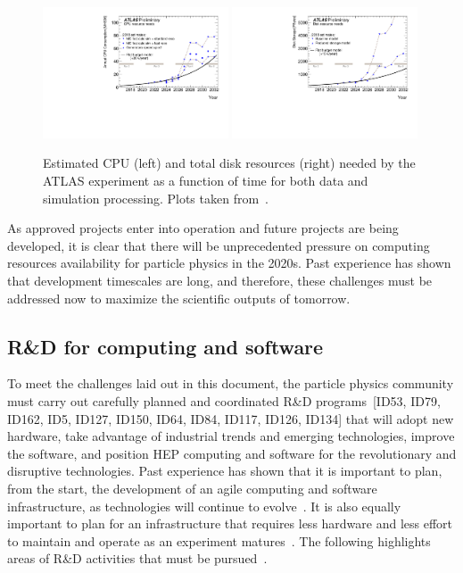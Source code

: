 \begin{figure}
    \centering
    \includegraphics[width=0.49\textwidth]{Instrum/img/ATLAS-cpu-HL-LHC.pdf}\hfill
    \includegraphics[width=0.49\textwidth]{Instrum/img/ATLAS-disk-HL-LHC.pdf}
    \caption{Estimated CPU (left) and total disk resources (right) needed by the ATLAS experiment as a function of time for both data and simulation processing.  Plots taken from~\cite{bib:atlas-computing}.
    }
    \label{fig:atlas-computing}
\end{figure}

As approved projects enter into operation and future projects are being developed, it is clear that there will be unprecedented pressure on computing resources availability for particle physics in the 2020s. 
Past experience has shown that development timescales are long, and therefore, these challenges must be addressed now to maximize the scientific outputs of tomorrow.  


\subsection{R\&D for computing and software}

To meet the challenges laid out in this document, the particle physics community must carry out carefully planned and coordinated R\&D programs~[ID53, ID79, ID162, ID5, ID127, ID150, ID64, ID84, ID117, ID126, ID134] that will adopt new hardware, take advantage of industrial trends and emerging technologies, improve the software, and position HEP computing and software for the revolutionary and disruptive technologies. Past experience has shown that it is important to plan, from the start, the development of an agile computing and software infrastructure, as technologies will continue to evolve~\cite{bib:RJ-talk}.  It is also equally important to plan for an infrastructure that requires less hardware and less effort to maintain and operate as an experiment matures~\cite{bib:RJ-talk}. The following highlights areas of R\&D activities that must be pursued~\cite{bib:MG-talk,bib:GS-talk}.

